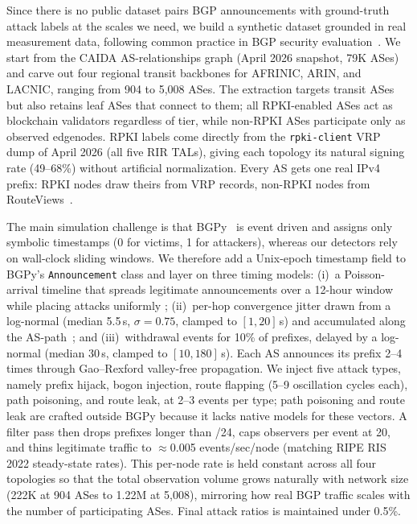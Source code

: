 \documentclass[conference]{IEEEtran}
\newcommand{\BfPara}[1]{\vspace{1mm}{\noindent\textbf{#1.}}\xspace}
\begin{document}
\BfPara{Dataset generation}
 Since there is no public dataset pairs BGP announcements with ground-truth attack labels at the scales we need, we build a synthetic dataset grounded in real measurement data, following common practice in BGP security evaluation~\cite{furuness2024bgpy}. We start from the CAIDA AS-relationships graph (April 2026 snapshot, 79K ASes)~\cite{caida-dataset} and carve out four regional transit backbones for AFRINIC, ARIN, and LACNIC, ranging from 904 to 5{,}008 ASes. The extraction targets transit ASes but also retains leaf ASes that connect to them; all RPKI-enabled ASes act as blockchain validators regardless of tier, while non-RPKI ASes participate only as observed edgenodes. RPKI labels come directly from the \texttt{rpki-client} VRP dump of April 2026 (all five RIR TALs), giving each topology its natural signing rate (49--68\%) without artificial normalization. Every AS gets one real IPv4 prefix: RPKI nodes draw theirs from VRP records, non-RPKI nodes from RouteViews~\cite{routeviews}.

The main simulation challenge is that BGPy~\cite{furuness2024bgpy} is event driven and assigns only symbolic timestamps (0 for victims, 1 for attackers), whereas our detectors rely on wall-clock sliding windows. We therefore add a Unix-epoch timestamp field to BGPy's \texttt{Announcement} class and layer on three timing models: (i)~a Poisson-arrival timeline that spreads legitimate announcements over a 12-hour window while placing attacks uniformly ; (ii)~per-hop convergence jitter drawn from a log-normal (median 5.5\,s, $\sigma{=}0.75$, clamped to $[1,20]$\,s) and accumulated along the AS-path~\cite{labovitz2001delayed}; and (iii)~withdrawal events for 10\% of prefixes, delayed by a log-normal (median 30\,s, clamped to $[10,180]$\,s). Each AS announces its prefix 2--4 times through Gao--Rexford valley-free propagation. We inject five attack types, namely prefix hijack, bogon injection, route flapping (5--9 oscillation cycles each), path poisoning, and route leak, at 2--3 events per type; path poisoning and route leak are crafted outside BGPy because it lacks native models for these vectors. A filter pass then drops prefixes longer than /24, caps observers per event at 20, and thins legitimate traffic to ${\approx}$0.005 events/sec/node (matching RIPE RIS 2022 steady-state rates). This per-node rate is held constant across all four topologies so that the total observation volume grows naturally with network size (222K at 904 ASes to 1.22M at 5{,}008), mirroring how real BGP traffic scales with the number of participating ASes. Final attack ratios is maintained under 0.5\%.
\end{document}
